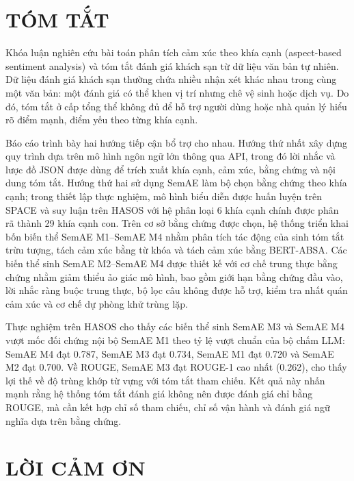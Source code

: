 \documentclass[12pt,a4paper]{report}
\begin{document}
\chapter*{TÓM TẮT}

Khóa luận nghiên cứu bài toán phân tích cảm xúc theo khía cạnh (aspect-based sentiment analysis) và tóm tắt đánh giá khách sạn từ dữ liệu văn bản tự nhiên. Dữ liệu đánh giá khách sạn thường chứa nhiều nhận xét khác nhau trong cùng một văn bản: một đánh giá có thể khen vị trí nhưng chê vệ sinh hoặc dịch vụ. Do đó, tóm tắt ở cấp tổng thể không đủ để hỗ trợ người dùng hoặc nhà quản lý hiểu rõ điểm mạnh, điểm yếu theo từng khía cạnh.

Báo cáo trình bày hai hướng tiếp cận bổ trợ cho nhau. Hướng thứ nhất xây dựng quy trình dựa trên mô hình ngôn ngữ lớn thông qua API, trong đó lời nhắc và lược đồ JSON được dùng để trích xuất khía cạnh, cảm xúc, bằng chứng và nội dung tóm tắt. Hướng thứ hai sử dụng SemAE làm bộ chọn bằng chứng theo khía cạnh; trong thiết lập thực nghiệm, mô hình biểu diễn được huấn luyện trên SPACE và suy luận trên HASOS với hệ phân loại 6 khía cạnh chính được phân rã thành 29 khía cạnh con. Trên cơ sở bằng chứng được chọn, hệ thống triển khai bốn biến thể SemAE M1--SemAE M4 nhằm phân tích tác động của sinh tóm tắt trừu tượng, tách cảm xúc bằng từ khóa và tách cảm xúc bằng BERT-ABSA. Các biến thể sinh SemAE M2--SemAE M4 được thiết kế với cơ chế trung thực bằng chứng nhằm giảm thiểu ảo giác mô hình, bao gồm giới hạn bằng chứng đầu vào, lời nhắc ràng buộc trung thực, bộ lọc câu không được hỗ trợ, kiểm tra nhất quán cảm xúc và cơ chế dự phòng khử trùng lặp.

Thực nghiệm trên HASOS cho thấy các biến thể sinh SemAE M3 và SemAE M4 vượt mốc đối chứng nội bộ SemAE M1 theo tỷ lệ vượt chuẩn của bộ chấm LLM: SemAE M4 đạt \num{0.787}, SemAE M3 đạt \num{0.734}, SemAE M1 đạt \num{0.720} và SemAE M2 đạt \num{0.700}. Về ROUGE, SemAE M3 đạt ROUGE-1 cao nhất (\num{0.262}), cho thấy lợi thế về độ trùng khớp từ vựng với tóm tắt tham chiếu. Kết quả này nhấn mạnh rằng hệ thống tóm tắt đánh giá không nên được đánh giá chỉ bằng ROUGE, mà cần kết hợp chỉ số tham chiếu, chỉ số vận hành và đánh giá ngữ nghĩa dựa trên bằng chứng.

\clearpage

\tableofcontents
\clearpage

\chapter*{LỜI CẢM ƠN}
\end{document}
